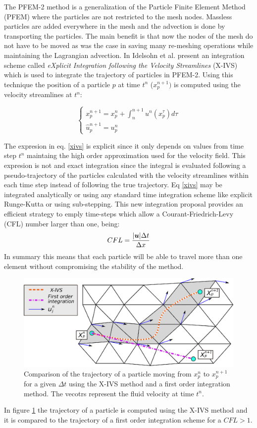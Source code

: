 The PFEM-2 method is a generalization of the Particle Finite Element Method (PFEM) \cite{sergio:pfem} where the particles are not restricted to the mesh nodes. Massless particles are added everywhere in the mesh and the advection is done by transporting the particles. The main benefit is that now the nodes of the mesh do not have to be moved as was the case in \cite{sergio:pfem} saving many re-meshing operations while maintaining the Lagrangian advection. In \cite{sergio:xivs1} Idelsohn et al. present an integration scheme called {\em eXplicit Integration following the Velocity Streamlines} (X-IVS) which is used to integrate the trajectory of particles in PFEM-2. Using this technique the position of a particle $p$ at time $t^n$ ($x_p^{n+1})$ is computed using the velocity streamlines at $t^n$:

\begin{equation}\label{xivs}
  \begin{cases}
    x_p^{n+1}=x_p^n+\int_n^{n+1} u^n(x_p^\tau) d\tau\\
    \hat{u}^{n+1}_p=u_p^n
  \end{cases}
\end{equation}

The expresion in eq. \ref{xivs} is explicit since it only depends on values from time step $t^n$ maintaing the high order approximation used for the velocity field. This expresion is not and exact integration since the integral is evaluated following a pseudo-trajectory of the particles calculated with the velocity streamlines within each time step instead of following the true trajectory. Eq \ref{xivs} may be integrated analytically or using any standard time integration scheme like explicit Runge-Kutta or using sub-stepping. This new integration proposal provides an efficient strategy to emply time-steps which allow a Courant-Friedrich-Levy (CFL) number larger than one, being:
\begin{equation}
  CFL=\frac{|\boldsymbol{u}|\Delta t}{\Delta x}
\end{equation}
In summary  this means that each particle will be able to travel more than one element without compromising the stability of the method.

\begin{figure}[htp] 
\centering 
\includegraphics[scale=.8]{./imgs/xivs.eps}
\caption{Comparison of the trajectory of a particle moving from $x_p^n$ to $x_p^{n+1}$ for a given $\Delta t$ using the X-IVS method and a first order integration method. The vecotrs represent the fluid velocity at time $t^n$.}
\label{fig:xivs}
\end{figure}

In figure \ref{fig:xivs} the trajectory of a particle is computed using the X-IVS method and it is compared to the trajectory of a first order integration scheme for a $CFL>1$. 
